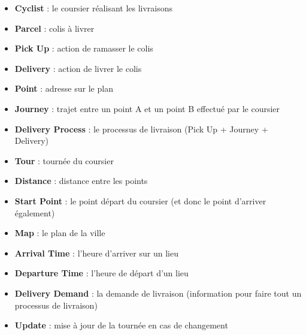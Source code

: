 \documentclass{scrartcl}
\begin{document}
\begin{itemize}
\item \textbf{Cyclist} : le coursier réalisant les livraisons
\item \textbf{Parcel} : colis à livrer
\item \textbf{Pick Up }: action de ramasser le colis 
\item \textbf{Delivery} : action de livrer le colis
\item \textbf{Point} : adresse sur le plan
\item \textbf{Journey} : trajet entre un point A et un point B effectué par le coursier
\item \textbf{Delivery Process }: le processus de livraison (Pick Up + Journey + Delivery)
\item \textbf{Tour} : tournée du coursier
\item \textbf{Distance} : distance entre les points
\item \textbf{Start Point} : le point départ du coursier (et donc le point d'arriver également)
\item \textbf{Map} : le plan de la ville
\item \textbf{Arrival Time }: l'heure d'arriver sur un lieu
\item \textbf{Departure Time} : l'heure de départ d'un lieu
\item \textbf{Delivery Demand} : la demande de livraison (information pour faire tout un processus de livraison)
\item \textbf{Update }: mise à jour de la tournée en cas de changement

\end{itemize}
\end{document}
